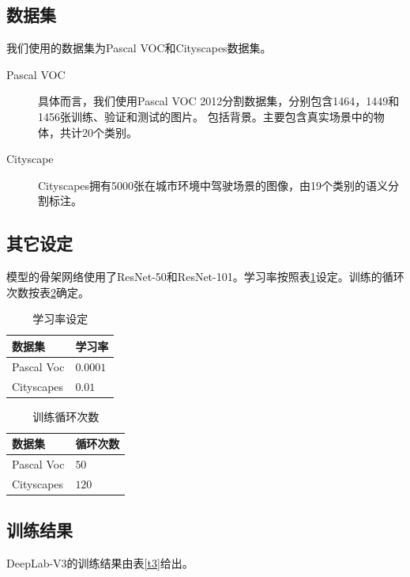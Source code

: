 \documentclass[10pt, a4paper]{article}
\begin{document}
\subsection{数据集}
我们使用的数据集为Pascal VOC和Cityscapes数据集。
\begin{description}
    \item[Pascal VOC] 具体而言，我们使用Pascal VOC 2012分割数据集，分别包含1464，1449和1456张训练、验证和测试的图片。
    包括背景。主要包含真实场景中的物体，共计20个类别。
    \item[Cityscape] Cityscapes拥有5000张在城市环境中驾驶场景的图像，由19个类别的语义分割标注。
\end{description}

\subsection{其它设定}
模型的骨架网络使用了ResNet-50和ResNet-101。学习率按照表\ref{t1}设定。训练的循环次数按表\ref{t2}确定。

\begin{table}[!htbp]
\begin{center}  
\begin{tabular}{ll}
    \toprule
    数据集 & 学习率\\
    \midrule
    Pascal Voc & $0.0001$ \\
    Cityscapes & $0.01$ \\
    \bottomrule
\end{tabular}
\end{center}
\caption{学习率设定}
\label{t1}
\end{table}

\begin{table}[!htbp]
\begin{center}  
\begin{tabular}{ll}
    \toprule
    数据集 & 循环次数\\
    \midrule
    Pascal Voc & $50$ \\
    Cityscapes & $120$ \\
    \bottomrule
\end{tabular}
\end{center}
\caption{训练循环次数}
\label{t2}
\end{table}

\subsection{训练结果}
DeepLab-V3的训练结果由表\ref{t3}给出。
\end{document}
